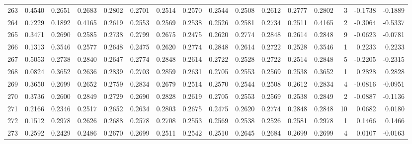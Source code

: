 \begin{tabular}{lrrrrrrrrrrrrrrr}
263 &      0.4540 &  0.2651 &  0.2683 &  0.2802 &  0.2701 &  0.2514 &  0.2570 &  0.2544 &  0.2508 &  0.2612 &   0.2777 &     0.2802 &      3 &                   -0.1738 &                    -0.1889 \\
264 &      0.7229 &  0.1892 &  0.4165 &  0.2619 &  0.2553 &  0.2569 &  0.2538 &  0.2526 &  0.2581 &  0.2734 &   0.2511 &     0.4165 &      2 &                   -0.3064 &                    -0.5337 \\
265 &      0.3471 &  0.2690 &  0.2585 &  0.2738 &  0.2799 &  0.2675 &  0.2475 &  0.2620 &  0.2774 &  0.2848 &   0.2614 &     0.2848 &      9 &                   -0.0623 &                    -0.0781 \\
266 &      0.1313 &  0.3546 &  0.2577 &  0.2648 &  0.2475 &  0.2620 &  0.2774 &  0.2848 &  0.2614 &  0.2722 &   0.2528 &     0.3546 &      1 &                    0.2233 &                     0.2233 \\
267 &      0.5053 &  0.2738 &  0.2840 &  0.2647 &  0.2774 &  0.2848 &  0.2614 &  0.2722 &  0.2528 &  0.2722 &   0.2514 &     0.2848 &      5 &                   -0.2205 &                    -0.2315 \\
268 &      0.0824 &  0.3652 &  0.2636 &  0.2839 &  0.2703 &  0.2859 &  0.2631 &  0.2705 &  0.2553 &  0.2569 &   0.2538 &     0.3652 &      1 &                    0.2828 &                     0.2828 \\
269 &      0.3650 &  0.2699 &  0.2652 &  0.2759 &  0.2834 &  0.2679 &  0.2514 &  0.2570 &  0.2544 &  0.2508 &   0.2612 &     0.2834 &      4 &                   -0.0816 &                    -0.0951 \\
270 &      0.3736 &  0.2600 &  0.2849 &  0.2729 &  0.2690 &  0.2828 &  0.2619 &  0.2705 &  0.2553 &  0.2569 &   0.2538 &     0.2849 &      2 &                   -0.0887 &                    -0.1136 \\
271 &      0.2166 &  0.2346 &  0.2517 &  0.2652 &  0.2634 &  0.2803 &  0.2675 &  0.2475 &  0.2620 &  0.2774 &   0.2848 &     0.2848 &     10 &                    0.0682 &                     0.0180 \\
272 &      0.1512 &  0.2978 &  0.2626 &  0.2688 &  0.2578 &  0.2708 &  0.2553 &  0.2569 &  0.2538 &  0.2526 &   0.2581 &     0.2978 &      1 &                    0.1466 &                     0.1466 \\
273 &      0.2592 &  0.2429 &  0.2486 &  0.2670 &  0.2699 &  0.2511 &  0.2542 &  0.2510 &  0.2645 &  0.2684 &   0.2699 &     0.2699 &      4 &                    0.0107 &                    -0.0163 \\

\end{tabular}
